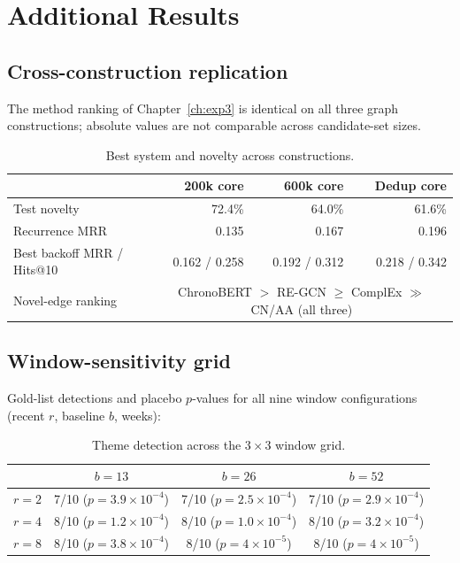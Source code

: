 \documentclass[a4paper,12pt]{report}
\begin{document}
\chapter{Additional Results}
\section*{Cross-construction replication}
The method ranking of Chapter~\ref{ch:exp3} is identical on all three graph
constructions; absolute values are not comparable across candidate-set sizes.

\begin{table}[ht]
\centering
\caption{Best system and novelty across constructions.}
\begin{tabular}{lrrr}
\toprule
 & 200k core & 600k core & Dedup core \\
\midrule
Test novelty & 72.4\% & 64.0\% & 61.6\% \\
Recurrence MRR & 0.135 & 0.167 & 0.196 \\
Best backoff MRR / Hits@10 & 0.162 / 0.258 & 0.192 / 0.312 & 0.218 / 0.342 \\
Novel-edge ranking & \multicolumn{3}{c}{ChronoBERT $>$ RE-GCN $\geq$ ComplEx
$\gg$ CN/AA (all three)} \\
\bottomrule
\end{tabular}
\end{table}

\section*{Window-sensitivity grid}
Gold-list detections and placebo $p$-values for all nine window
configurations (recent $r$, baseline $b$, weeks):

\begin{table}[ht]
\centering
\caption{Theme detection across the $3\times3$ window grid.}
\begin{tabular}{lccc}
\toprule
 & $b=13$ & $b=26$ & $b=52$ \\
\midrule
$r=2$ & 7/10 ($p=3.9\times10^{-4}$) & 7/10 ($p=2.5\times10^{-4}$) &
7/10 ($p=2.9\times10^{-4}$) \\
$r=4$ & 8/10 ($p=1.2\times10^{-4}$) & 8/10 ($p=1.0\times10^{-4}$) &
8/10 ($p=3.2\times10^{-4}$) \\
$r=8$ & 8/10 ($p=3.8\times10^{-4}$) & 8/10 ($p=4\times10^{-5}$) &
8/10 ($p=4\times10^{-5}$) \\
\bottomrule
\end{tabular}
\end{table}
\end{document}
